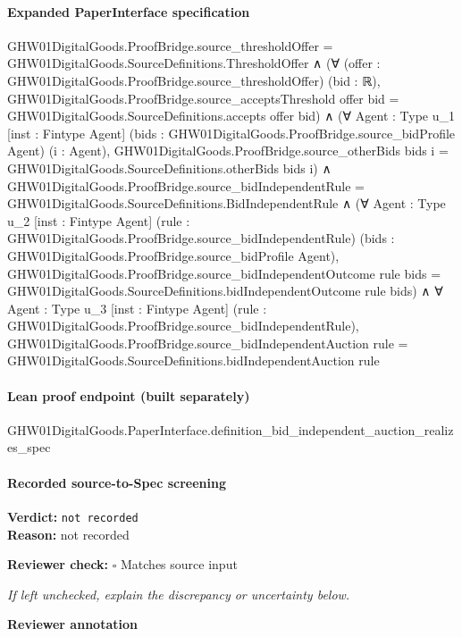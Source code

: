 \documentclass[10pt]{article}
\newcommand{\reviewerbox}{%
  \par\noindent\fbox{\parbox{0.96\linewidth}{\rule{0pt}{0.38in}}}\par
}
\newcommand{\reviewmatch}[1]{%
  \par\noindent\textbf{Reviewer check:} $\square$\; #1\par
  \noindent\emph{If left unchecked, explain the discrepancy or uncertainty below.}\par
}
\begin{document}
\paragraph{Expanded PaperInterface specification}
\begin{ReviewVerbatim}
GHW01DigitalGoods.ProofBridge.source_thresholdOffer = GHW01DigitalGoods.SourceDefinitions.ThresholdOffer ∧
  (∀ (offer : GHW01DigitalGoods.ProofBridge.source_thresholdOffer) (bid : ℝ),
      GHW01DigitalGoods.ProofBridge.source_acceptsThreshold offer bid =
        GHW01DigitalGoods.SourceDefinitions.accepts offer bid) ∧
    (∀ {Agent : Type u_1} [inst : Fintype Agent] (bids : GHW01DigitalGoods.ProofBridge.source_bidProfile Agent)
        (i : Agent),
        GHW01DigitalGoods.ProofBridge.source_otherBids bids i = GHW01DigitalGoods.SourceDefinitions.otherBids bids i) ∧
      GHW01DigitalGoods.ProofBridge.source_bidIndependentRule = GHW01DigitalGoods.SourceDefinitions.BidIndependentRule ∧
        (∀ {Agent : Type u_2} [inst : Fintype Agent] (rule : GHW01DigitalGoods.ProofBridge.source_bidIndependentRule)
            (bids : GHW01DigitalGoods.ProofBridge.source_bidProfile Agent),
            GHW01DigitalGoods.ProofBridge.source_bidIndependentOutcome rule bids =
              GHW01DigitalGoods.SourceDefinitions.bidIndependentOutcome rule bids) ∧
          ∀ {Agent : Type u_3} [inst : Fintype Agent] (rule : GHW01DigitalGoods.ProofBridge.source_bidIndependentRule),
            GHW01DigitalGoods.ProofBridge.source_bidIndependentAuction rule =
              GHW01DigitalGoods.SourceDefinitions.bidIndependentAuction rule
\end{ReviewVerbatim}

\paragraph{Lean proof endpoint (built separately)}\begin{ReviewVerbatim}
GHW01DigitalGoods.PaperInterface.definition_bid_independent_auction_realizes_spec
\end{ReviewVerbatim}

\paragraph{Recorded source-to-Spec screening}
\textbf{Verdict:} \texttt{not recorded}
\\
\textbf{Reason:} not recorded
\reviewmatch{Matches source input}
\noindent\textbf{Reviewer annotation}\par
\reviewerbox
\clearpage
\hypertarget{source-claim-7602d03e98effe60}{}
\end{document}
